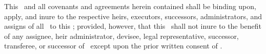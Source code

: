 This \amendmentTitle\ and all covenants and agreements herein contained shall be binding upon, apply, and inure to the respective heirs, executors, successors, administrators, and assigns of all \parties\ to this \amendmentTitle; provided, however, that this \amendmentTitle\ shall not inure to the benefit of any assignee, heir administrator, devisee, legal representative, successor, transferee, or successor of \lessee\ except upon the prior written consent of \lessor.
